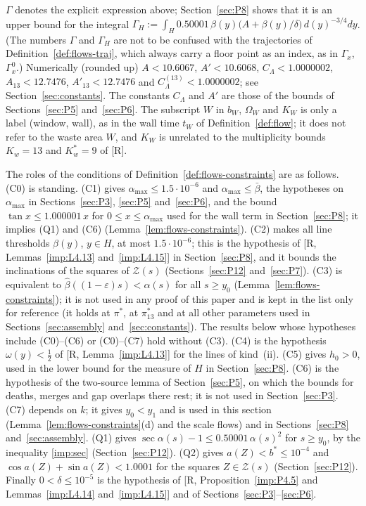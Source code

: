 \documentclass[11pt]{amsart}
\newcommand{\amax}{\alpha_{\max}}
\theoremstyle{definition}
\theoremstyle{remark}
\numberwithin{equation}{section}
\begin{document}
$\Gamma$ denotes the explicit expression above; Section~\ref{sec:P8} shows that it is an upper bound for the integral
$\Gamma_H:=\int_H0.50001\,\beta(y)\big(A+\beta(y)/\delta\big)\,d(y)^{-3/4}dy$. (The numbers $\Gamma$ and $\Gamma_H$ are
not to be confused with the trajectories of Definition~\ref{def:flows-traj}, which always carry a floor point as an
index, as in $\Gamma_x$, $\Gamma^0_x$.) Numerically (rounded up)
$A<10.6067$, $A'<10.6068$, $C_\Lambda<1.0000002$, $A_{13}<12.7476$, $A'_{13}<12.7476$ and $C^{(13)}_\Lambda<1.0000002$;
see Section~\ref{sec:constants}. The constants $C_\Lambda$ and $A'$ are those of the bounds of
Sections~\ref{sec:P5} and~\ref{sec:P6}. The subscript $W$ in $b_W$, $\Omega_W$ and $K_W$ is only a label (window,
wall), as in the wall time $t_W$ of Definition~\ref{def:flow}; it does not refer to the waste area $W$, and $K_W$ is
unrelated to the multiplicity bounds $K_w=13$ and $K_w^*=9$ of [R].

The roles of the conditions of Definition~\ref{def:flows-constraints} are as follows.
(C0) is standing. (C1) gives $\amax\le1.5\cdot10^{-6}$ and $\amax\le\bar\beta$, the hypotheses on $\amax$ in
Sections~\ref{sec:P3}, \ref{sec:P5} and~\ref{sec:P6}, and the bound $\tan x\le1.000001\,x$ for $0\le x\le\amax$ used
for the wall term in Section~\ref{sec:P8}; it implies (Q1) and (C6) (Lemma~\ref{lem:flows-constraints}). (C2) makes
all line thresholds $\beta(y)$, $y\in H$, at most $1.5\cdot10^{-6}$; this is the
hypothesis of [R, Lemmas~\ref{imp:L4.13} and~\ref{imp:L4.15}] in Section~\ref{sec:P8}, and it bounds the inclinations of
the squares of $\mathcal Z(s)$ (Sections~\ref{sec:P12} and~\ref{sec:P7}). (C3) is equivalent to
$\hat\beta((1-\varepsilon)s)<\alpha(s)$ for all $s\ge y_0$ (Lemma~\ref{lem:flows-constraints}); it is not used in any
proof of this paper and is kept in the list only for reference (it holds at $\pi^*$, at $\pi^*_{13}$ and at all other
parameters used in Sections~\ref{sec:assembly} and~\ref{sec:constants}). The results below whose hypotheses include
(C0)--(C6) or (C0)--(C7) hold without (C3). (C4) is the hypothesis $\omega(y)<\frac12$ of
[R, Lemma~\ref{imp:L4.13}] for the lines of kind~(ii). (C5) gives $h_0>0$, used in the lower bound for the measure of
$H$ in Section~\ref{sec:P8}. (C6) is the hypothesis of the two-source lemma of Section~\ref{sec:P5}, on which the bounds
for deaths, merges and gap overlaps there rest; it is not used in Section~\ref{sec:P3}. (C7) depends on $k$; it gives
$y_0<y_1$ and is used in this section (Lemma~\ref{lem:flows-constraints}(d) and the scale flows) and in
Sections~\ref{sec:P8} and~\ref{sec:assembly}. (Q1) gives $\sec\alpha(s)-1\le0.50001\,\alpha(s)^2$ for $s\ge y_0$, by
the inequality \eqref{imp:sec} (Section~\ref{sec:P12}). (Q2) gives $a(Z)<b^*\le10^{-4}$ and
$\cos a(Z)+\sin a(Z)<1.0001$ for the squares $Z\in\mathcal Z(s)$ (Section~\ref{sec:P12}). Finally $0<\delta\le10^{-5}$
is the hypothesis of [R, Proposition~\ref{imp:P4.5} and Lemmas~\ref{imp:L4.14} and~\ref{imp:L4.15}] and of
Sections~\ref{sec:P3}--\ref{sec:P6}.
\end{document}
